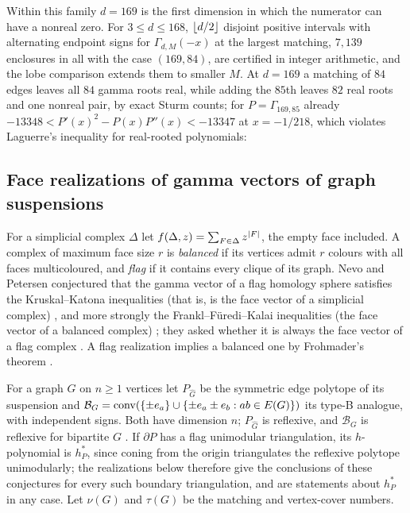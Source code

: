 Within this family $d=169$ is the first dimension in which the numerator
can have a nonreal zero. For $3\le d\le168$, $\lfloor d/2\rfloor$ disjoint positive
intervals with alternating endpoint signs for $\Gamma_{d,M}(-x)$ at the
largest matching, $7{,}139$ enclosures in all with the case $(169,84)$,
are certified in integer arithmetic, and the lobe comparison extends them
to smaller $M$. At $d=169$ a matching of $84$ edges leaves all $84$ gamma
roots real, while adding the $85$th leaves $82$ real roots and one nonreal
pair, by exact Sturm counts; for $P=\Gamma_{169,85}$ already
$-13348<P'(x)^2-P(x)P''(x)<-13347$ at $x=-1/218$, which violates Laguerre's
inequality for real-rooted polynomials:

\subsection{Face realizations of gamma vectors of graph suspensions}\label{grw:sec:gamma}

For a simplicial complex $\Delta$ let $f(\Delta,z)=\sum_{F\in\Delta}z^{\lvert F\rvert}$,
the empty face included. A complex of maximum face size $r$ is
\emph{balanced} if its vertices admit $r$ colours with all faces
multicoloured, and \emph{flag} if it contains every clique of its graph.
Nevo and Petersen conjectured that the gamma vector of a flag homology
sphere satisfies the Kruskal--Katona inequalities (that is, is the face
vector of a simplicial complex) \cite[Conjecture~1.4]{NevoPetersen2011Gamma},
and more strongly the Frankl--F\"uredi--Kalai inequalities (the face vector
of a balanced complex) \cite[Conjecture~6.3]{NevoPetersen2011Gamma}; they
asked whether it is always the face vector of a flag complex
\cite[Problem~6.4]{NevoPetersen2011Gamma}. A flag realization implies a
balanced one by Frohmader's theorem \cite{Frohmader2008Face}.

For a graph $G$ on $n\ge1$ vertices let $P_{\widehat G}$ be the symmetric
edge polytope of its suspension and
$\mathcal B_G=\operatorname{conv}(\{\pm e_a\}\cup\{\pm e_a\pm e_b:ab\in E(G)\})$ its
type-B analogue, with independent signs. Both have dimension $n$;
$P_{\widehat G}$ is reflexive, and $\mathcal B_G$ is reflexive for bipartite
$G$ \cite{OhsugiTsuchiya2021Symmetric}. If $\partial P$ has a flag unimodular
triangulation, its $h$-polynomial is $h^*_P$, since coning from the origin
triangulates the reflexive polytope unimodularly; the realizations below
therefore give the conclusions of these conjectures for every such boundary
triangulation, and are statements about $h^*_P$ in any case. Let $\nu(G)$
and $\tau(G)$ be the matching and vertex-cover numbers.


